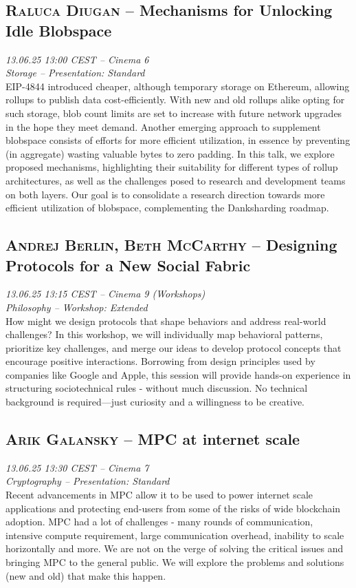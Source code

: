 \clearpage
\subsection {\textsc{Raluca Diugan}  -- Mechanisms for Unlocking Idle Blobspace} \noindent \textit {13.06.25 13:00 CEST -- Cinema 6\\ Storage -- Presentation: Standard}\\[1em] EIP-4844 introduced cheaper, although temporary storage on Ethereum, allowing rollups to publish data cost-efficiently. With new and old rollups alike opting for such storage, blob count limits are set to increase with future network upgrades in the hope they meet demand. Another emerging approach to supplement blobspace consists of efforts for more efficient utilization, in essence by preventing (in aggregate) wasting valuable bytes to zero padding. In this talk, we explore proposed mechanisms, highlighting their suitability for different types of rollup architectures, as well as the challenges posed to research and development teams on both layers. Our goal is to consolidate a research direction towards more efficient utilization of blobspace, complementing the Danksharding roadmap.

\clearpage
\subsection {\textsc{Andrej Berlin, Beth McCarthy}  -- Designing Protocols for a New Social Fabric} \noindent \textit {13.06.25 13:15 CEST -- Cinema 9 (Workshops)\\ Philosophy -- Workshop: Extended}\\[1em] How might we design protocols that shape behaviors and address real-world challenges? In this workshop, we will individually map behavioral patterns, prioritize key challenges, and merge our ideas to develop protocol concepts that encourage positive interactions. Borrowing from design principles used by companies like Google and Apple, this session will provide hands-on experience in structuring sociotechnical rules - without much discussion. No technical background is required—just curiosity and a willingness to be creative.

\clearpage
\subsection {\textsc{Arik Galansky}  -- MPC at internet scale} \noindent \textit {13.06.25 13:30 CEST -- Cinema 7\\ Cryptography -- Presentation: Standard}\\[1em] Recent advancements in MPC allow it to be used to power internet scale applications and protecting end-users from some of the risks of wide blockchain adoption. MPC had a lot of challenges - many rounds of communication, intensive compute requirement, large communication overhead, inability to scale horizontally and more. We are not on the verge of solving the critical issues and bringing MPC to the general public. We will explore the problems and solutions (new and old) that make this happen.

